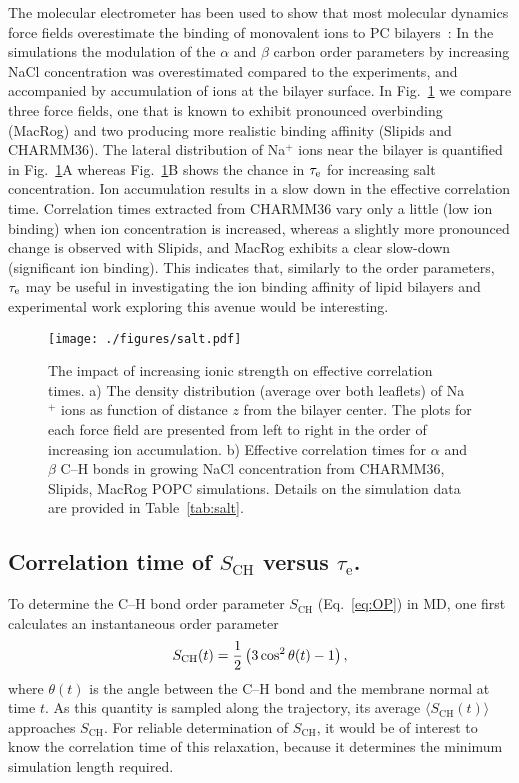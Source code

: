 \documentclass[journal=jpcbfk,manuscript=article,layout=twocolumn]{achemso}
\begin{document}
The molecular electrometer has been used to show that most molecular dynamics force fields overestimate the binding of monovalent ions to PC bilayers~\cite{catte16}: In the simulations the modulation of the $\alpha$ and $\beta$ carbon order parameters by increasing NaCl concentration was overestimated compared to the experiments, and accompanied by accumulation of ions at the bilayer surface. In Fig.~\ref{fig:salt} we compare three force fields, one that is known to exhibit pronounced overbinding~\cite{catte16} (MacRog) and two producing more realistic binding affinity (Slipids and CHARMM36). The lateral distribution of Na$^{+}$ ions near the bilayer is quantified in Fig.~\ref{fig:salt}A whereas Fig.~\ref{fig:salt}B shows the chance in $\tau_{\rm{e}}$ for increasing salt concentration. Ion accumulation results in a slow down in the effective correlation time. %
Correlation times extracted from CHARMM36 vary only a little (low ion binding) when ion concentration is increased, whereas a slightly more pronounced change is observed with Slipids, and MacRog exhibits a clear slow-down (significant ion binding). This indicates that, similarly to the order parameters, $\tau_{\rm{e}}$ may be useful in investigating the ion binding affinity of lipid bilayers and experimental work exploring this avenue would be interesting.   


\begin{figure}[ht!]
\centering
\texttt{[image: ./figures/salt.pdf]} 
\caption{The impact of increasing ionic strength on effective correlation times. a) The density distribution (average over both leaflets) of Na$^{+}$ ions as function of distance $z$ from the bilayer center. The plots for each force field are presented from left to right in the order of increasing ion accumulation. b) Effective correlation times for $\alpha$ and $\beta$ C--H bonds in growing NaCl concentration from CHARMM36, Slipids, MacRog POPC simulations. Details on the simulation data are provided in Table~\ref{tab:salt}.}
\label{fig:salt}
\end{figure}

\subsection*{Correlation time of $S_\mathrm{CH}$ versus $\tau_\mathrm e$.}
To determine the C--H bond order parameter $S_\mathrm{CH}$ (Eq.~\eqref{eq:OP})
in MD, one first calculates an instantaneous order parameter
\begin{equation}
\label{eq:instantaneousOP}
S_{\rm{CH}}(t)=\frac{1}{2}\left( 3\cos^{2}\theta(t)-1 \right),
\end{equation}
where $\theta(t)$ is the angle between the C--H bond and the membrane normal at time $t$.
As this quantity is sampled along the trajectory, its average
$\langle S_\mathrm{CH}(t) \rangle$
approaches $S_\mathrm{CH}$.
For reliable determination of $S_\mathrm{CH}$,
it would be of interest to know the correlation time of this relaxation,
because it determines the minimum simulation length required.
\end{document}
